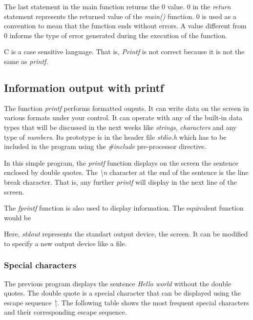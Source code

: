 The last statement in the main function returns the 0 value. $0$ in the \textit{return} statement represents the returned value of the \textit{main()} function. 0 is used as a convention to mean that the function ends without errors. A value different from 0 informs the type of error generated during the execution of the function.

C is a case sensitive language. That is, \textit{Printf} is not correct because it is not the same as \textit{printf}.

\subsection{Information output with printf}
The function \textit{printf} performs formatted ouputs. It can write data on the screen in various formats under your control. It can operate with any of the built-in data types that will be discussed in the next weeks like \textit{strings}, \textit{characters} and any type of \textit{numbers}. Its prototype is in the header file \textit{stdio.h} which has to be included in the program using the \textit{\#include} pre-processor directive.

\begin{program}
\end{program}

In this simple program, the \textit{printf} function displays on the screen the sentence enclosed by double quotes. The \textit{\textbackslash n} character at the end of the sentence is the line break character. That is, any further \textit{printf} will display in the next line of the screen.

The \textit{fprintf} function is also used to display information. The equivalent function would be
\begin{program}
\end{program}
Here, \textit{stdout} represents the standart output device, the screen. It can be modified to specify a new output device like a file.

\subsubsection{Special characters}
The previous program displays the sentence \textit{Hello world} without the double quotes. The double quote is a special character that can be displayed using the escape sequence \textit{\textbackslash \"}. The following table shows the most frequent special characters and their corresponding escape sequence.

